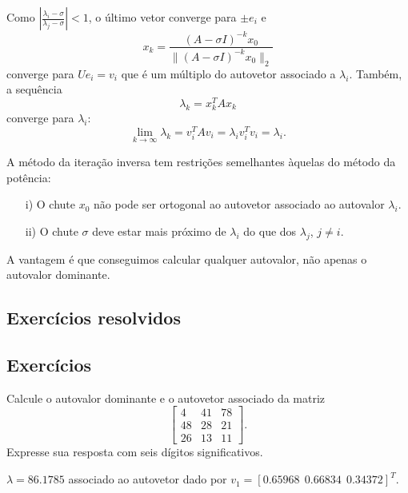 Como $\left|\frac{\lambda_i-\sigma}{\lambda_j-\sigma}\right|<1$, o último vetor converge para $\pm e_i$ e
\begin{equation}
x_k=\frac{(A-\sigma I)^{-k}x_0}{\|(A-\sigma I)^{-k}x_0\|_2}
\end{equation}
converge para $Ue_i=v_i$ que é um múltiplo do autovetor associado a $\lambda_i$. Também, a sequência
\begin{equation}
\lambda_k=x_k^TAx_k
\end{equation}
converge para $\lambda_i$:
\begin{equation}
\lim_{k\to\infty}\lambda_k= v_i^TA v_i=\lambda_iv_i^Tv_i=\lambda_i.
\end{equation}

A método da iteração inversa tem restrições semelhantes àquelas do método da potência:
\begin{itemize}
 \item[i)] O chute $x_0$ não pode ser ortogonal ao autovetor associado ao autovalor $\lambda_i$.
 \item[ii)] O chute $\sigma$ deve estar mais próximo de $\lambda_i$ do que dos $\lambda_j$, $j\neq i$.
\end{itemize}
A vantagem é que conseguimos calcular qualquer autovalor, não apenas o autovalor dominante.

\subsection*{Exercícios resolvidos}

\construirExeresol

\subsection*{Exercícios}

\begin{exer} Calcule o autovalor dominante e o autovetor associado da matriz
\begin{equation}\left[\begin{array}{ccc}
 4&     41  &  78\\
 48   & 28&    21  \\
 26   & 13 &   11
\end{array}\right].
\end{equation}
Expresse sua resposta com seis dígitos significativos.
\end{exer}
\begin{resp}
$\lambda=86.1785$ associado ao autovetor dado por $v_1=\left[ 0.65968~~ 0.66834~~ 0.34372\right]^T$.
\end{resp}

